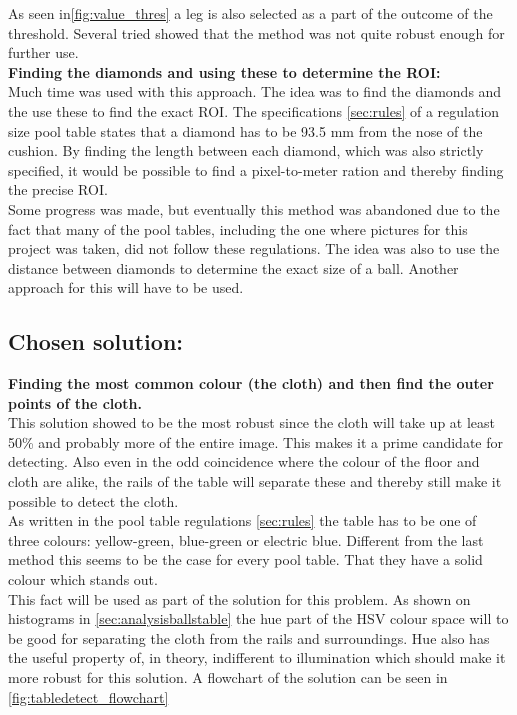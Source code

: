 As seen in\ref{fig:value_thres} a leg is also selected as a part of the outcome of the threshold. Several tried showed that the method was not quite robust enough for further use.\\

\textbf{Finding the diamonds and using these to determine the ROI:}\\
Much time was used with this approach. The idea was to find the diamonds and the use these to find the exact ROI. The specifications \ref{sec:rules} of a regulation size pool table states that a diamond has to be 93.5 mm from the nose of the cushion. By finding the length between each diamond, which was also strictly specified, it would be possible to find a pixel-to-meter ration and thereby finding the precise ROI.\\

Some progress was made, but eventually this method was abandoned due to the fact that many of the pool tables, including the one where pictures for this  project was taken, did not follow these regulations. The idea was also to use the distance between diamonds to determine the exact size of a ball. Another approach for this will have to be used.\\

\subsection{Chosen solution:}

\textbf{Finding the most common colour (the cloth) and then find the outer points of the cloth.}\\
This solution showed to be the most robust since the cloth will take up at least 50\% and probably more of the entire image. This makes it a prime candidate for detecting. Also even in the odd coincidence where the colour of the floor and cloth are alike, the rails of the table will separate these and thereby still make it possible to detect the cloth.\\

As written in the pool table regulations \ref{sec:rules} the table has to be one of three colours: yellow-green, blue-green or electric blue. Different from the last method this seems to be the case for every pool table. That they have a solid colour which stands out.\\

This fact will be used as part of the solution for this problem. As shown on histograms in \ref{sec:analysisballstable} the hue part of the HSV colour space will to be good for separating the cloth from the rails and surroundings. Hue also has the useful property of, in theory, indifferent to illumination which should make it more robust for this solution. A flowchart of the solution can be seen in \ref{fig:tabledetect_flowchart}

